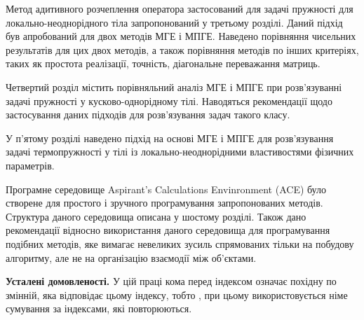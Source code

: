 Метод адитивного розчеплення оператора застосований для задачі пружності
для локально-неоднорідного тіла запропонований у третьому розділі. Даний
підхід був апробований для двох методів МГЕ і МПГЕ. Наведено порівняння
чисельних результатів для цих двох методів, а також порівняння методів
по інших критеріях, таких як простота реалізації, точність, діагональне
переважання матриць.

Четвертий розділ містить порівняльний аналіз МГЕ і МПГЕ при розв'язуванні задачі пружності у кусково-однорідному тілі. Наводяться рекомендації щодо застосування даних підходів для розв'язування задач такого класу.

У п'ятому розділі наведено підхід на основі МГЕ і МПГЕ для розв'язування
задачі термопружності у тілі із локально-неоднорідними властивостями
фізичних параметрів.

Програмне середовище Aspirant's Calculations Envinronment (ACE) було
створене для простого і зручного програмування запропонованих методів.
Структура даного середовища описана у шостому розділі. Також дано
рекомендації відносно використання даного середовища для програмування
подібних методів, яке вимагає невеликих зусиль спрямованих тільки на
побудову алгоритму, але не на організацію взаємодії між об'єктами.

\textbf{Усталені домовленості.} У цій праці кома перед індексом
означає похідну по змінній, яка відповідає цьому індексу, тобто , при
цьому викори­стовується німе сумування за індек­сами, які повторюються.
